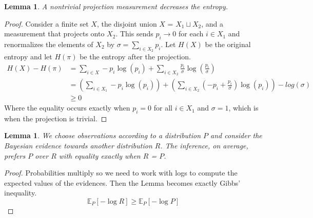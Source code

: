 \documentclass[12pt,a4paper]{article}
\newtheorem{lem}[thm]{Lemma}
\begin{document}
\begin{lem}
A nontrivial projection measurement decreases the entropy.
\end{lem}
\begin{proof}
Consider a finite set $X$, the disjoint union $X$ = $X_1 \sqcup X_2$, and a measurement that projects onto $X_2$.  This sends $p_i \rightarrow 0$ for each $i \in X_1$ and renormalizes the elements of $X_2$ by $\sigma = \sum_{i \in X_2} p_i$.  Let $H(X)$ be the original entropy and let $H(\pi)$ be the entropy after the projection.
\[
\begin{split}
H(X) - H(\pi) &= \sum_{i \in X} - p_i \log(p_i) + \sum_{i \in X_2} \frac{p_i}{\sigma} \log\left(\frac{p_i}{\sigma}\right) \\
              &= \left(\sum_{i \in X_1} - p_i \log(p_i)\right) + \left(\sum_{i \in X_2} \left(-p_i + \frac{p_i}{\sigma}\right) \log(p_i) \right) - log(\sigma) \\
              &\ge 0
\end{split}
\]
Where the equality occurs exactly when $p_i = 0$ for all $i \in X_1$ and $\sigma = 1$, which is when the projection is trivial. 
\end{proof}


\begin{lem}
We choose observations according to a distribution $P$ and consider the Bayesian evidence towards another distribution $R$.  The inference, on average, prefers $P$ over $R$ with equality exactly when $R$ = $P$.
\end{lem}
\begin{proof}
Probabilities multiply so we need to work with logs to compute the expected values of the evidences.  Then the Lemma becomes exactly Gibbs' inequality.
\[
\mathbb{E}_P[-\log{R}] \ge \mathbb{E}_P[-\log{P}]
\]
\end{proof}
\end{document}
